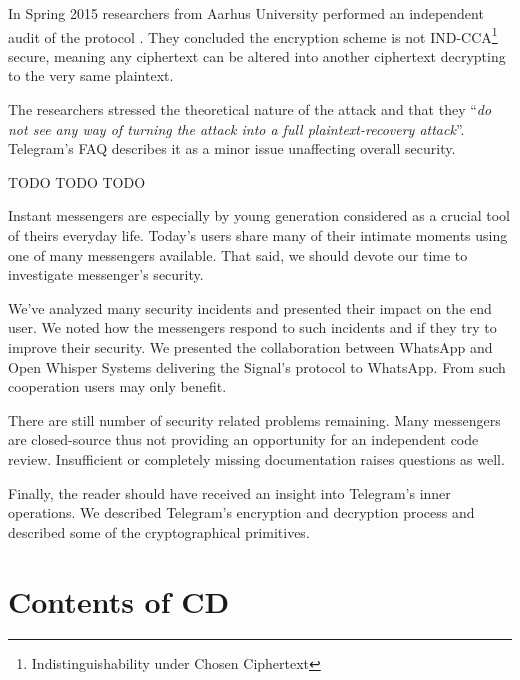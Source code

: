 \documentclass[thesis=M,english]{FITthesis}[2012/10/20]
\begin{document}
In Spring 2015 researchers from Aarhus University performed an independent audit of the protocol \cite{telegram-aarhus}. They concluded the encryption scheme is not IND-CCA\footnote{Indistinguishability under Chosen Ciphertext} secure, meaning any ciphertext can be altered into another ciphertext decrypting to the very same plaintext.

The researchers stressed the theoretical nature of the attack and that they ``\emph{do not see any way of turning the attack into a full plaintext-recovery attack}''\cite{telegram-aarhus}. Telegram's FAQ describes it as a minor issue unaffecting overall security. \cite{telegram-techfaq}




\begin{conclusion}

TODO TODO TODO

Instant messengers are especially by young generation considered as a crucial tool of theirs everyday life. Today's users share many of their intimate moments using one of many messengers available. That said, we should devote our time to investigate messenger's security.

We've analyzed many security incidents and presented their impact on the end user. We noted how the messengers respond to such incidents and if they try to improve their security. We presented the collaboration between WhatsApp and Open Whisper Systems delivering the Signal's protocol to WhatsApp. From such cooperation users may only benefit.

There are still number of security related problems remaining. Many messengers are closed-source thus not providing an opportunity for an independent code review. Insufficient or completely missing documentation raises questions as well.

Finally, the reader should have received an insight into Telegram's inner operations. We described Telegram's encryption and decryption process and described some of the cryptographical primitives.

\end{conclusion}





\appendix


\chapter{Contents of CD}\label{app:CDcontent}
\end{document}
